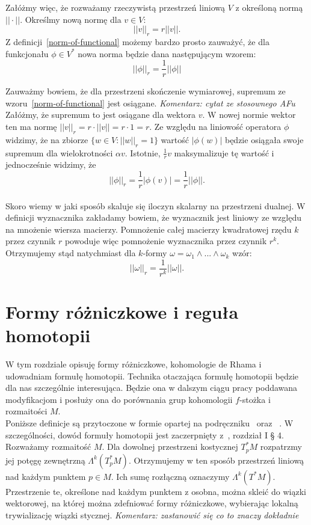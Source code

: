 \documentclass[licencjacka]{pracamgr}
\theoremstyle{definition}
\theoremstyle{definition}
\theoremstyle{plain}
\theoremstyle{plain}
\theoremstyle{plain}
\theoremstyle{plain}
\begin{document}
Załóżmy więc, że rozważamy rzeczywistą przestrzeń liniową $V$ z określoną
normą $|| \cdot ||$. Określmy nową normę dla $v \in V$:
\[
|| v ||_r = r || v ||.
\]
Z definicji~\ref{norm-of-functional} możemy bardzo prosto zauważyć, że
dla funkcjonału $\phi \in V^\ast$ nowa norma będzie dana następującym
wzorem:
\[
|| \phi ||_r = \frac{1}{r} ||\phi ||
\]

Zauważmy bowiem, że dla przestrzeni skończenie wymiarowej, supremum
ze wzoru~\ref{norm-of-functional} jest osiągane. 
\emph{Komentarz: cytat ze stosownego AFu}
Załóżmy, że supremum to jest osiągane dla wektora $v$. W nowej normie wektor
ten ma normę $|| v ||_r = r \cdot || v || = r \cdot 1 = r$. Ze względu
na liniowość operatora $\phi$ widzimy, że na zbiorze $\{w \in V: ||w||_r = 1\}$
wartość $| \phi (w) |$ będzie osiągała swoje supremum dla wielokrotności
$\alpha v$. Istotnie, $\frac{1}{r} v$ maksymalizuje tę wartość i 
jednocześnie widzimy, że 
\[
||\phi||_r = \frac{1}{r} |\phi(v)| = \frac{1}{r}|| \phi ||.
\]  \\

Skoro wiemy w jaki sposób skaluje się iloczyn skalarny na przestrzeni dualnej.
W definicji wyznacznika zakładamy bowiem, że wyznacznik jest liniowy ze względu
na mnożenie wiersza macierzy. Pomnożenie całej macierzy kwadratowej rzędu $k$
przez czynnik $r$ powoduje więc pomnożenie wyznacznika przez czynnik $r^k$.
Otrzymujemy stąd natychmiast dla $k$-formy $\omega = \omega_1 \wedge ... \wedge
\omega_k$  wzór:
\begin{equation}\label{scaling-of-norm}
|| \omega ||_r = \frac{1}{r^k} || \omega ||.
\end{equation}


\chapter{Formy różniczkowe i reguła homotopii}
W tym rozdziale opisuję formy różniczkowe, kohomologie de Rhama i
udowadniam formułę homotopii.
Technika otaczająca formułę homotopii
będzie dla nas szczególnie interesująca. Będzie ona w dalszym
ciągu pracy poddawana modyfikacjom i posłuży ona 
do porównania grup kohomologii $f$-stożka i rozmaitości $M$. \\

Poniższe definicje są przytoczone w formie opartej na podręczniku~\cite{lee}
oraz ~\cite{bott}. W szczególności, dowód formuły homotopii jest zaczerpnięty
z~\cite{bott}, rozdział I § 4. \\

Rozważamy rozmaitość $M$. Dla dowolnej przestrzeni kostycznej 
$T_p^\ast M$ rozpatrzmy jej potęgę zewnętrzną $\Lambda^k(T_p^\ast M)$.
Otrzymujemy w ten sposób przestrzeń liniową nad każdym punktem $p \in M$.
Ich sumę rozłączną oznaczymy $\Lambda^k(T^\ast M)$. Przestrzenie te,
określone nad każdym punktem z osobna, można skleić do wiązki wektorowej, na
której można zdefniować formy różniczkowe, wybierając lokalną
trywializację wiązki stycznej. 
\emph{Komentarz: zastanowić się co to znaczy dokładnie} \\
\end{document}
